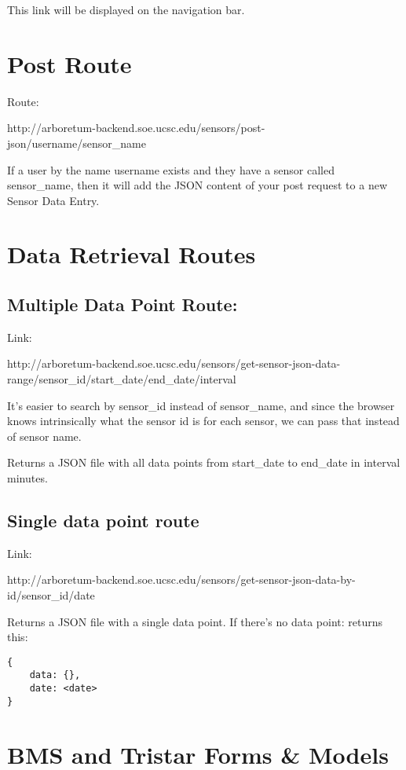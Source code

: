 This link will be displayed on the navigation bar.

\section{Post Route}\label{post-route}

Route:

http://arboretum-backend.soe.ucsc.edu/sensors/post-json/username/sensor\_name

If a user by the name username exists and they have a sensor called
sensor\_name, then it will add the JSON content of your post request to
a new Sensor Data Entry.

\section{Data Retrieval Routes}\label{data-retrieval-routes}

\subsection{Multiple Data Point Route:}\label{multiple-data-point-route}

Link:

http://arboretum-backend.soe.ucsc.edu/sensors/get-sensor-json-data-range/sensor\_id/start\_date/end\_date/interval

It's easier to search by sensor\_id instead of sensor\_name, and since
the browser knows intrinsically what the sensor id is for each sensor,
we can pass that instead of sensor name.

Returns a JSON file with all data points from start\_date to end\_date
in interval minutes.

\subsection{Single data point route}\label{single-data-point-route}

Link:

http://arboretum-backend.soe.ucsc.edu/sensors/get-sensor-json-data-by-id/sensor\_id/date

Returns a JSON file with a single data point. If there's no data point:
returns this:

\begin{verbatim}
{
    data: {},
    date: <date>
}
\end{verbatim}

\section{BMS and Tristar Forms \&
Models}\label{bms-and-tristar-forms-models}

